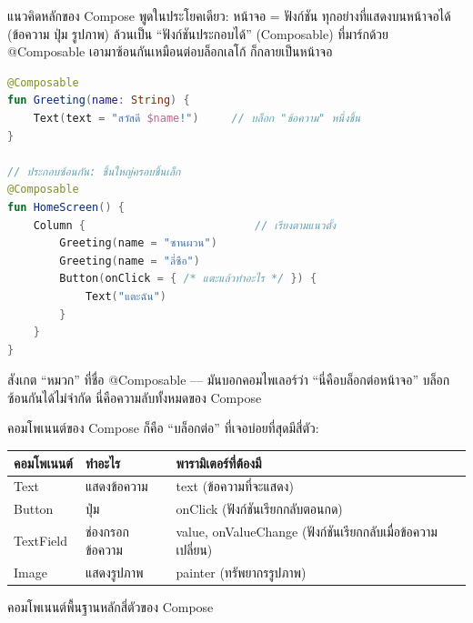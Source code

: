 


แนวคิดหลักของ Compose พูดในประโยคเดียว: หน้าจอ = ฟังก์ชัน ทุกอย่างที่แสดงบนหน้าจอได้ (ข้อความ ปุ่ม รูปภาพ) ล้วนเป็น “ฟังก์ชันประกอบได้” (Composable) ที่มาร์กด้วย @Composable เอามาซ้อนกันเหมือนต่อบล็อกเลโก้ ก็กลายเป็นหน้าจอ

\begin{lstlisting}[language=Kotlin]
@Composable
fun Greeting(name: String) {
    Text(text = "สวัสดี $name!")     // บล็อก "ข้อความ" หนึ่งชิ้น
}

// ประกอบซ้อนกัน: ชิ้นใหญ่ครอบชิ้นเล็ก
@Composable
fun HomeScreen() {
    Column {                          // เรียงตามแนวตั้ง
        Greeting(name = "ซานผวน")
        Greeting(name = "ลี่ซือ")
        Button(onClick = { /* แตะแล้วทำอะไร */ }) {
            Text("แตะฉัน")
        }
    }
}
\end{lstlisting}

สังเกต “หมวก” ที่ชื่อ @Composable — มันบอกคอมไพเลอร์ว่า “นี่คือบล็อกต่อหน้าจอ” บล็อกซ้อนกันได้ไม่จำกัด นี่คือความลับทั้งหมดของ Compose


คอมโพเนนต์ของ Compose ก็คือ “บล็อกต่อ” ที่เจอบ่อยที่สุดมีสี่ตัว:

\begin{center}
\begin{tabularx}{\linewidth}{|X|X|X|}
\hline
\textbf{คอมโพเนนต์} & \textbf{ทำอะไร} & \textbf{พารามิเตอร์ที่ต้องมี} \tabularnewline
\hline
Text & แสดงข้อความ & text (ข้อความที่จะแสดง) \tabularnewline
Button & ปุ่ม & onClick (ฟังก์ชันเรียกกลับตอนกด) \tabularnewline
TextField & ช่องกรอกข้อความ & value, onValueChange (ฟังก์ชันเรียกกลับเมื่อข้อความเปลี่ยน) \tabularnewline
Image & แสดงรูปภาพ & painter (ทรัพยากรรูปภาพ) \tabularnewline
\hline
\end{tabularx}
\end{center}

\begin{center}\small\color{gray}คอมโพเนนต์พื้นฐานหลักสี่ตัวของ Compose\end{center}

